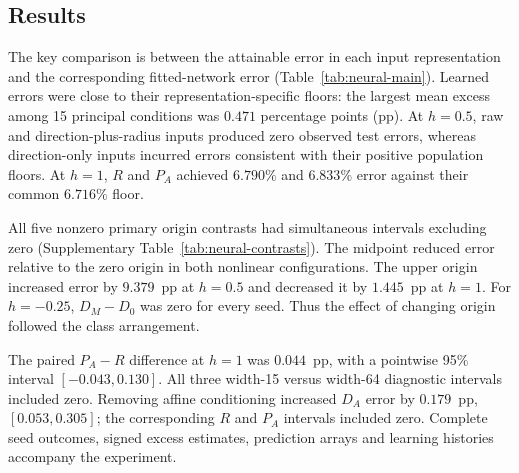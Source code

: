 {\subsection{Results}
The key comparison is between the attainable error in each input representation and the corresponding fitted-network error (Table~\ref{tab:neural-main}). Learned errors were close to their representation-specific floors: the largest mean excess among 15 principal conditions was $0.471$ percentage points (pp). At $h=0.5$, raw and direction-plus-radius inputs produced zero observed test errors, whereas direction-only inputs incurred errors consistent with their positive population floors. At $h=1$, $R$ and $P_A$ achieved $6.790\%$ and $6.833\%$ error against their common $6.716\%$ floor.

All five nonzero primary origin contrasts had simultaneous intervals excluding zero (Supplementary Table~\ref{tab:neural-contrasts}). The midpoint reduced error relative to the zero origin in both nonlinear configurations. The upper origin increased error by $9.379$~pp at $h=0.5$ and decreased it by $1.445$~pp at $h=1$. For $h=-0.25$, $D_M-D_0$ was zero for every seed. Thus the effect of changing origin followed the class arrangement.

The paired $P_A-R$ difference at $h=1$ was $0.044$~pp, with a pointwise 95\% interval $[-0.043,0.130]$. All three width-15 versus width-64 diagnostic intervals included zero. Removing affine conditioning increased $D_A$ error by $0.179$~pp, $[0.053,0.305]$; the corresponding $R$ and $P_A$ intervals included zero. Complete seed outcomes, signed excess estimates, prediction arrays and learning histories accompany the experiment.

\HalfMoonMainRiskTable

}

